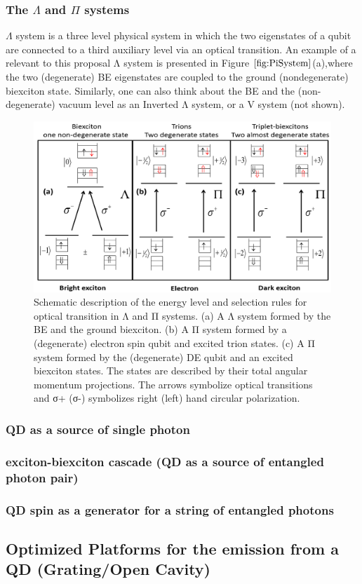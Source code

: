 \subsubsection{The $\Lambda$ and $\Pi$ systems}
$\Lambda$ system is a three level physical system in which the two eigenstates of a qubit are connected to a third auxiliary level via an optical transition. An example of a relevant to this proposal Λ system is presented in Figure $\ref{fig:PiSystem}$(a),where the two (degenerate) BE eigenstates are coupled to the ground (nondegenerate) biexciton state. Similarly, one can also think about the BE and the (non-degenerate) vacuum level as an Inverted Λ system, or a V system (not shown). 
\begin{figure}[H]
	\centering
	\includegraphics[scale=0.32]{figures/pISystem.png}
	\caption{Schematic description of the energy level and selection rules for
optical transition in Λ and Π systems. (a) A Λ system formed by the BE and
the ground biexciton. (b) A Π system formed by a (degenerate) electron spin
qubit and excited trion states. (c) A Π system formed by the (degenerate) DE
qubit and an excited biexciton states. The states are described by their total
angular momentum projections. The arrows symbolize optical transitions
and σ+ (σ-) symbolizes right (left) hand circular polarization.}
	\label{fig:PiSystem}
\end{figure}
\subsubsection{QD as a source of single photon}
\subsubsection{exciton-biexciton cascade (QD as a source of entangled photon pair)}
\subsubsection{QD spin as a generator for a string of entangled photons}
\subsection{Optimized Platforms for the emission from a QD (Grating/Open Cavity)}
